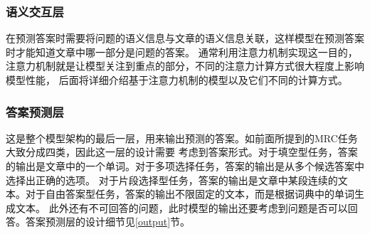 \documentclass{article}
\newcommand{\upcite}[1]{\textsuperscript{\textsuperscript{\cite{#1}}}}
\begin{document}

\subsubsection{语义交互层}
在预测答案时需要将问题的语义信息与文章的语义信息关联，这样模型在预测答案时才能知道文章中哪一部分是问题的答案。
通常利用注意力机制实现这一目的，注意力机制就是让模型关注到重点的部分，不同的注意力计算方式很大程度上影响模型性能，
后面将详细介绍基于注意力机制的模型以及它们不同的计算方式。
\subsubsection{答案预测层}
这是整个模型架构的最后一层，用来输出预测的答案。如前面所提到的MRC任务大致分成四类，因此这一层的设计需要
考虑到答案形式。对于填空型任务，答案的输出是文章中的一个单词。对于多项选择任务，答案的输出是从多个候选答案中选择出正确的选项。
对于片段选择型任务，答案的输出是文章中某段连续的文本。对于自由答案型任务，答案的输出不限固定的文本，而是根据词典中的单词生成文本。
此外还有不可回答的问题，此时模型的输出还要考虑到问题是否可以回答。答案预测层的设计细节见\ref{output}节。

%




%
%

%
%

\end{document}
